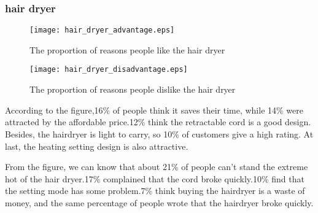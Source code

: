 \documentclass{mcmthesis}
\begin{document}
	\subsubsection{hair dryer}
	\begin{figure}[H]
		\begin{minipage}[t]{0.5\textwidth}
			\centering
			\texttt{[image: hair\_dryer\_advantage.eps]}
			\caption{The proportion of reasons people like the hair dryer}
		\end{minipage}
		\qquad
		\begin{minipage}[t]{0.5\textwidth}
			\centering
			\texttt{[image: hair\_dryer\_disadvantage.eps]}
			\caption{The proportion of reasons people dislike the hair dryer }
		\end{minipage}
	\end{figure}
	\begin{flushleft}
		According to the figure,16\% of people think it saves their time, while 14\% were attracted by the affordable price.12\% think the retractable cord is a good design. Besides, the hairdryer is light to carry, so 10\% of customers give a high rating. At last, the heating setting design is also attractive.
	\end{flushleft}
	\begin{flushleft}
		From the figure, we can know that about 21\% of people can't stand the extreme hot of the hair dryer.17\% complained that the cord broke quickly.10\% find that the setting mode has some problem.7\% think buying the hairdryer is a waste of money, and the same percentage of people wrote that the hairdryer broke quickly.
	\end{flushleft}
	
\end{document}
